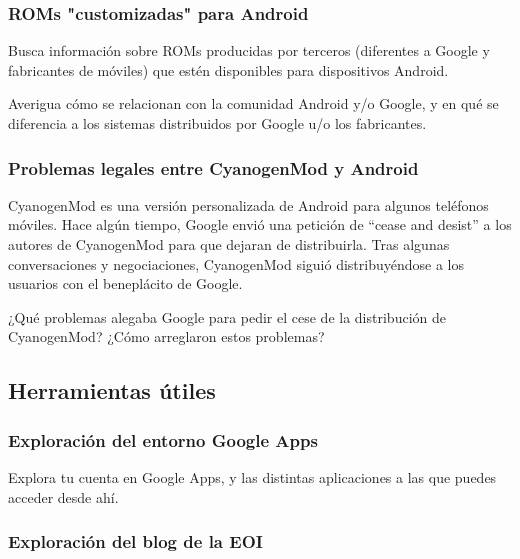 \documentclass[a4paper,12pt]{article}
\begin{document}
\subsubsection{ROMs "customizadas" para Android}
\label{sec:roms-cust-para}

Busca información sobre ROMs producidas por terceros (diferentes a
Google y fabricantes de móviles) que estén disponibles para
dispositivos Android.

Averigua cómo se relacionan con la comunidad Android y/o Google, y en
qué se diferencia a los sistemas distribuidos por Google u/o los
fabricantes.

\subsubsection{Problemas legales entre CyanogenMod y Android}
\label{sec:probl-legal-entre}

CyanogenMod es una versión personalizada de Android para algunos
teléfonos móviles. Hace algún tiempo, Google envió una petición de
``cease and desist'' a los autores de CyanogenMod para que dejaran de
distribuirla. Tras algunas conversaciones y negociaciones, CyanogenMod
siguió distribuyéndose a los usuarios con el beneplácito de Google.

¿Qué problemas alegaba Google para pedir el cese de la distribución de
CyanogenMod? ¿Cómo arreglaron estos problemas?

\subsection{Herramientas útiles}

\subsubsection{Exploración del entorno Google Apps}
\label{sub:googleapps}

Explora tu cuenta en Google Apps, y las distintas aplicaciones a las que puedes acceder desde ahí.

\subsubsection{Exploración del blog de la EOI}
\label{sub:blog}
\end{document}
